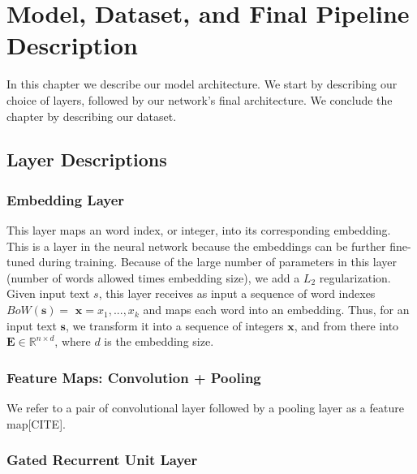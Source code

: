 
\chapter{Model, Dataset, and Final Pipeline Description}

In this chapter we describe our model architecture. We start by describing our choice of layers, followed by
our network's final architecture.
We conclude the chapter by
describing our dataset.

\section{Layer Descriptions}

\subsection{Embedding Layer}
This layer maps an word index, or integer, into its corresponding embedding. This is a layer in the
neural network because the embeddings can be further fine-tuned during training. Because of the large number of
parameters in this layer (number of words allowed times embedding size), we add a $L_2$ regularization.
Given input text $s$, this layer receives as input a sequence of word indexes $BoW(\bm{s})=$ $\bm{x} = x_1,...,x_k$
and maps each word into an embedding.
Thus, for an input text $\bm{s}$, we transform it into a sequence of integers $\bm{x}$, and from there into $\mathbf{E} \in \mathbb{R}^{n \times d}$, where $d$ is
the embedding size.

\subsection{Feature Maps: Convolution + Pooling}

We refer to a pair of convolutional layer followed by a pooling layer as a feature map[CITE].

\subsection{Gated Recurrent Unit Layer}

